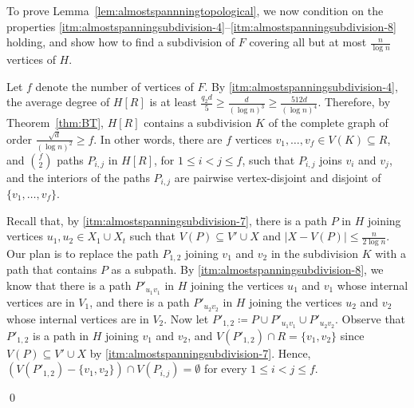 \documentclass[10pt]{article}
\theoremstyle{plain}
\numberwithin{theorem}{section}
\theoremstyle{definition}
\theoremstyle{remark}
\renewenvironment{proof}[1][]{\begin{trivlist}
\item[\hspace{\labelsep}{\bf\noindent Proof#1.\/}] }{\qed\end{trivlist}}
\renewcommand{\setminus}{-}
\theoremstyle{plain}
\begin{document}
\begin{proof}[ of Lemma~\ref{lem:almostspannningtopological}]
  
		To prove Lemma~\ref{lem:almostspannningtopological}, we now condition on the properties \ref{itm:almostspanningsubdivision-4}--\ref{itm:almostspanningsubdivision-8} holding, and show how to find a subdivision of $F$ covering all but at most $\frac{n}{\log n}$ vertices of $H$.

		Let $f$ denote the number of vertices of $F$.
		By \ref{itm:almostspanningsubdivision-4}, the average degree of $H[R]$ is at least $\frac{q_2 d}{5} \ge \frac{d}{(\log n)^3} \ge \frac{512 d}{(\log n)^4}$. Therefore, by Theorem~\ref{thm:BT}, $H[R]$ contains a subdivision $K$ of the complete graph of order $\frac{\sqrt{d}}{(\log n)^2} \ge f$. In other words, there are $f$ vertices $v_1, \ldots, v_f \in V(K) \subseteq R$, and $\binom{f}{2}$ paths $P_{i,j}$ in $H[R]$, for $1 \le i < j \le f$, such that $P_{i,j}$ joins $v_i$ and $v_j$, and the interiors of the paths $P_{i,j}$ are pairwise vertex-disjoint and disjoint of $\{v_1, \ldots, v_f\}$. 

		Recall that, by \ref{itm:almostspanningsubdivision-7}, there is a path $P$ in $H$ joining vertices $u_1, u_2 \in X_1 \cup X_t$ such that $V(P) \subseteq V' \cup X$ and $|X \setminus V(P)| \le \frac{n}{2\log n}$. Our plan is to replace the path $P_{1,2}$ joining $v_1$ and $v_2$ in the subdivision $K$ with a path that contains $P$ as a subpath. By \ref{itm:almostspanningsubdivision-8}, we know that there is a path $P'_{u_1v_1}$ in $H$ joining the vertices $u_1$ and $v_1$ whose internal vertices are in $V_1$, and there is a path $P'_{u_2v_2}$ in $H$ joining the vertices $u_2$ and $v_2$ whose internal vertices are in $V_2$. Now let $P'_{1,2} \coloneqq P \cup P'_{u_1v_1} \cup P'_{u_2v_2}$. Observe that $P'_{1,2}$ is a path in $H$ joining $v_1$ and $v_2$, and $V(P'_{1,2}) \cap R = \{ v_1, v_2 \}$ since $V(P) \subseteq V' \cup X$ by \ref{itm:almostspanningsubdivision-7}. Hence, $(V(P'_{1,2}) \setminus \{ v_1, v_2 \}) \cap V(P_{i,j}) = \emptyset$ for every $1 \le i < j \le f$. 


\end{proof}
\end{document}
